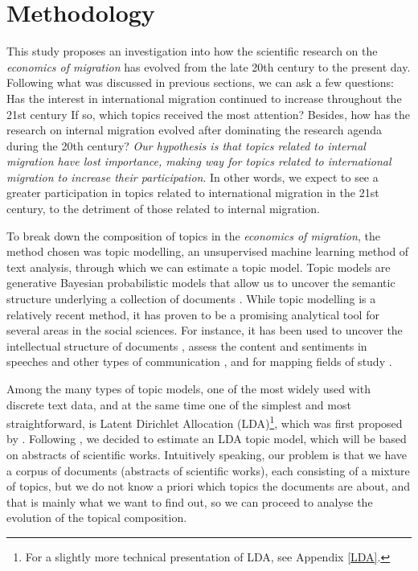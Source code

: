 \section{Methodology} \label{methodology}

This study proposes an investigation into how the scientific research on the \textit{economics of migration} has evolved from the late 20th century to the present day. Following what was discussed in previous sections, we can ask a few questions: Has the interest in international migration continued to increase throughout the 21st century If so, which topics received the most attention? Besides, how has the research on internal migration evolved after dominating the research agenda during the 20th century? \textit{Our hypothesis is that topics related to internal migration have lost importance, making way for topics related to international migration to increase their participation}. In other words, we expect to see a greater participation in topics related to international migration in the 21st century, to the detriment of those related to internal migration. 

To break down the composition of topics in the \textit{economics of migration}, the method chosen was topic modelling, an unsupervised machine learning method of text analysis, through which we can estimate a topic model. Topic models are generative Bayesian probabilistic models that allow us to uncover the semantic structure underlying a collection of documents \citep{blei_latent_2003, blei_topic_2009, evans_machine_2016}. While topic modelling is a relatively recent method, it has proven to be a promising analytical tool for several areas in the social sciences. For instance, it has been used to uncover the intellectual structure of documents \citep{griffiths_finding_2004}, assess the content and sentiments in speeches and other types of communication \citep{grimmer_bayesian_2010, hansen_transparency_2018}, and for mapping fields of study \citep{ambrosino_what_2018, pisarevskaya_mapping_2020}. 

Among the many types of topic models, one of the most widely used with discrete text data, and at the same time one of the simplest and most straightforward, is Latent Dirichlet Allocation (LDA)\footnote{For a slightly more technical presentation of LDA, see Appendix \ref{LDA}.}, which was first proposed by \cite{blei_latent_2003}. Following \cite{pisarevskaya_mapping_2020}, we decided to estimate an LDA topic model, which will be based on abstracts of scientific works. Intuitively speaking, our problem is that we have a corpus of documents (abstracts of scientific works), each consisting of a mixture of topics, but we do not know a priori which topics the documents are about, and that is mainly what we want to find out, so we can proceed to analyse the evolution of the topical composition.

